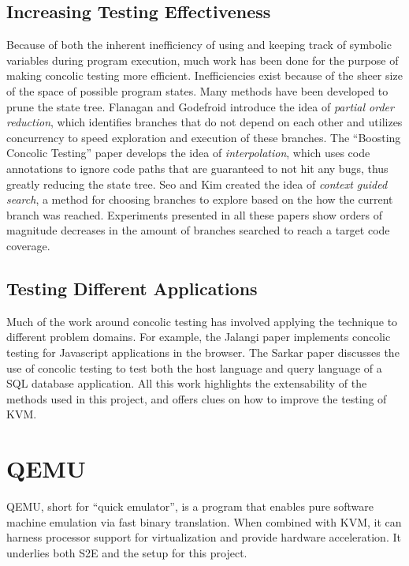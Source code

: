 \documentclass[11pt]{article}
\begin{document}
\subsection{Increasing Testing Effectiveness}
Because of both the inherent inefficiency of using and keeping track of symbolic
variables during program execution, much work has been done for the purpose of
making concolic testing more efficient. Inefficiencies exist because of the
sheer size of the space of possible program states. Many methods have been
developed to prune the state tree. Flanagan and Godefroid introduce the idea
of \textit{partial order reduction}, which identifies branches that do not
depend on each other and utilizes concurrency to speed exploration and execution
of these branches. The ``Boosting Concolic Testing'' paper develops the idea
of \textit{interpolation}, which uses code annotations to ignore code paths that
are guaranteed to not hit any bugs, thus greatly reducing the state tree. Seo
and Kim created the idea of \textit{context guided search}, a method for
choosing branches to explore based on the how the current branch was
reached. Experiments presented in all these papers show orders of magnitude
decreases in the amount of branches searched to reach a target code coverage. 

\subsection{Testing Different Applications}
Much of the work around concolic testing has involved applying the technique to
different problem domains. For example, the Jalangi paper implements concolic testing for
Javascript applications in the browser. The Sarkar paper discusses the use of
concolic testing to test both the host language and query language of a SQL
database application. All this work highlights the extensability of the methods
used in this project, and offers clues on how to improve the testing of KVM.

\section{QEMU}
QEMU, short for ``quick emulator'', is a program that enables pure software
machine emulation via fast binary translation. When combined with KVM, it can
harness processor support for virtualization and provide hardware
acceleration. It underlies both S2E and the setup for this project.
\end{document}
